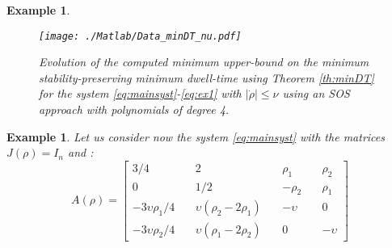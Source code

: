 \documentclass[12pt]{article}
\def\citep{\cite}
\newtheorem{example}[theorem]{Example}
\begin{document}
\begin{example}
\begin{figure}[h]
  \centering
  \texttt{[image: ./Matlab/Data\_minDT\_nu.pdf]}
  \caption{Evolution of the computed minimum upper-bound on the minimum stability-preserving minimum dwell-time using Theorem \ref{th:minDT} for the system \eqref{eq:mainsyst}-\eqref{eq:ex1} with $|\dot{\rho}|\le\nu$ using an SOS approach with polynomials of degree 4.}\label{fig:2}
\end{figure}
\end{example}




\begin{example}
  Let us consider now the system \eqref{eq:mainsyst} with the matrices $J(\rho)=I_n$ and \citep[p. 55]{Wu:95}:
  \begin{equation}\label{eq:ex2}
  A(\rho)=\begin{bmatrix}
   3/4 &\ & 2 &\ & \rho_1 &\ & \rho_2\\
    0 &\ & 1/2 &\ & -\rho_2 &\ & \rho_1\\
  -3\upsilon\rho_1/4   &\ & \upsilon\left(\rho_2-2\rho_1\right) &\ & -\upsilon &\ & 0\\
  -3\upsilon\rho_2/4    &\ & \upsilon\left(\rho_1-2\rho_2\right)  &\ & 0 &\ & -\upsilon
      \end{bmatrix}
\end{equation}

\end{example}
\end{document}
